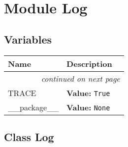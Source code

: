 %
%
%


\section{Module Log}

    \label{Log}


  \subsection{Variables}

    \vspace{-1cm}
\hspace{\varindent}\begin{longtable}{|p{\varnamewidth}|p{\vardescrwidth}|l}
\cline{1-2}
\cline{1-2} \centering \textbf{Name} & \centering \textbf{Description}& \\
\cline{1-2}
\endhead\cline{1-2}\multicolumn{3}{r}{\small\textit{continued on next page}}\\\endfoot\cline{1-2}
\endlastfoot\raggedright T\-R\-A\-C\-E\- & \raggedright \textbf{Value:} 
{\tt True}&\\
\cline{1-2}
\raggedright \_\-\_\-p\-a\-c\-k\-a\-g\-e\-\_\-\_\- & \raggedright \textbf{Value:} 
{\tt None}&\\
\cline{1-2}
\end{longtable}



\subsection{Class Log}

